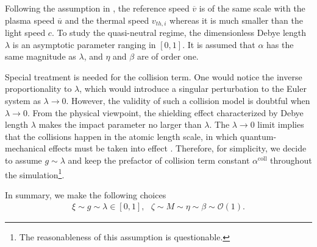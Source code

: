\documentclass{report}
\begin{document}
Following the assumption in \cite{degond_2017}, the reference speed $\overline{v}$ is of the same scale with the plasma speed $\overline{u}$ and the thermal speed $v_{th,i}$ whereas it is much smaller than the light speed $c$. To study the quasi-neutral regime, the dimensionless Debye length $\lambda$ is an asymptotic parameter ranging in $[0,1]$. It is assumed that $\alpha$ has the same magnitude as $\lambda$, and $\eta$ and $\beta$ are of order one. 

Special treatment is needed for the collision term. One would notice the inverse proportionality to $\lambda$, which would introduce a singular perturbation to the Euler system as $\lambda \rightarrow 0$. However, the validity of such a collision model is doubtful when $\lambda \rightarrow 0$. From the physical viewpoint, the shielding effect characterized by Debye length $\lambda$ makes the impact parameter no larger than $\lambda$. The $\lambda \rightarrow 0$ limit implies that the collisions happen in the atomic length scale, in which quantum-mechanical effects must be taken into effect \citep{frank_1972}. Therefore, for simplicity, we decide to assume $g \sim \lambda$ and keep the prefactor of collision term constant $\alpha^{\text{coll}}$ throughout the simulation\footnote{The reasonableness of this assumption is questionable.}.  

In summary, we make the following choices
\begin{align*}
    \xi \sim g \sim \lambda \in [0,1], \ \ \ \zeta \sim M \sim \eta \sim \beta \sim \mathcal{O}(1).
\end{align*}
\end{document}
